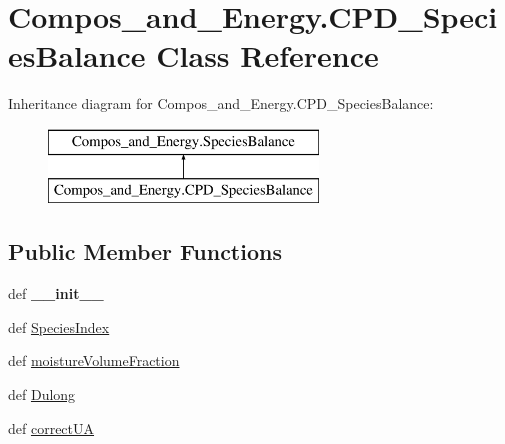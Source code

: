 \hypertarget{classCompos__and__Energy_1_1CPD__SpeciesBalance}{\section{\-Compos\-\_\-and\-\_\-\-Energy.\-C\-P\-D\-\_\-\-Species\-Balance \-Class \-Reference}
\label{classCompos__and__Energy_1_1CPD__SpeciesBalance}
}
\-Inheritance diagram for \-Compos\-\_\-and\-\_\-\-Energy.\-C\-P\-D\-\_\-\-Species\-Balance\-:\begin{figure}[H]
\begin{center}
\leavevmode
\includegraphics[height=2.000000cm]{classCompos__and__Energy_1_1CPD__SpeciesBalance}
\end{center}
\end{figure}
\subsection*{\-Public \-Member \-Functions}
\begin{DoxyCompactItemize}
\item 
\hypertarget{classCompos__and__Energy_1_1CPD__SpeciesBalance_a83897ac8fa055cd90b5a83751fe1b75f}{def {\bfseries \-\_\-\-\_\-init\-\_\-\-\_\-}}\label{classCompos__and__Energy_1_1CPD__SpeciesBalance_a83897ac8fa055cd90b5a83751fe1b75f}

\item 
def \hyperlink{classCompos__and__Energy_1_1SpeciesBalance_a5fec9a8d342543711abe2fc10632efb0}{\-Species\-Index}
\item 
def \hyperlink{classCompos__and__Energy_1_1SpeciesBalance_ae6b9b1a304a5b3686888725624c5e329}{moisture\-Volume\-Fraction}
\item 
def \hyperlink{classCompos__and__Energy_1_1SpeciesBalance_abeff1c726b62ba6c2d32173eb7f51d48}{\-Dulong}
\item 
def \hyperlink{classCompos__and__Energy_1_1SpeciesBalance_a05ae92b73a997e779c64bd2e6386a918}{correct\-U\-A}
\end{DoxyCompactItemize}
